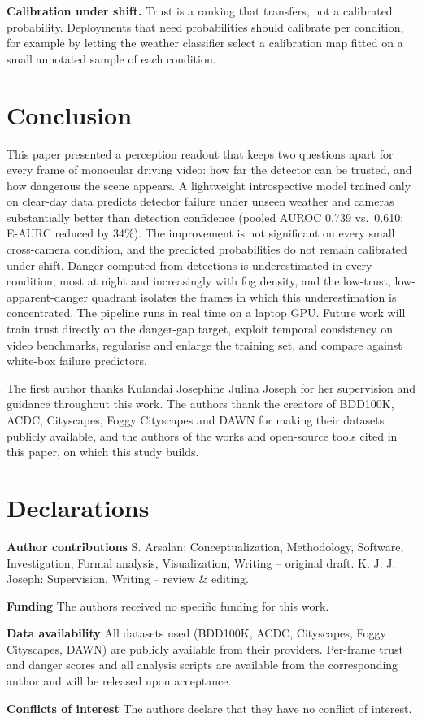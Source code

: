 \documentclass[pdflatex,sn-mathphys-num]{sn-jnl}
\begin{document}
\textbf{Calibration under shift.} Trust is a ranking that transfers, not a calibrated probability. Deployments that need probabilities should calibrate per condition, for example by letting the weather classifier select a calibration map fitted on a small annotated sample of each condition.

\section{Conclusion}\label{sec:conclusion}

This paper presented a perception readout that keeps two questions apart for every frame of monocular driving video: how far the detector can be trusted, and how dangerous the scene appears. A lightweight introspective model trained only on clear-day data predicts detector failure under unseen weather and cameras substantially better than detection confidence (pooled AUROC 0.739 vs.\ 0.610; E-AURC reduced by 34\%). The improvement is not significant on every small cross-camera condition, and the predicted probabilities do not remain calibrated under shift. Danger computed from detections is underestimated in every condition, most at night and increasingly with fog density, and the low-trust, low-apparent-danger quadrant isolates the frames in which this underestimation is concentrated. The pipeline runs in real time on a laptop GPU. Future work will train trust directly on the danger-gap target, exploit temporal consistency on video benchmarks, regularise and enlarge the training set, and compare against white-box failure predictors.

\backmatter

The first author thanks Kulandai Josephine Julina Joseph for her supervision and guidance throughout this work. The authors thank the creators of BDD100K, ACDC, Cityscapes, Foggy Cityscapes and DAWN for making their datasets publicly available, and the authors of the works and open-source tools cited in this paper, on which this study builds.

\section*{Declarations}

\textbf{Author contributions} S. Arsalan: Conceptualization, Methodology, Software, Investigation, Formal analysis, Visualization, Writing -- original draft. K. J. J. Joseph: Supervision, Writing -- review \& editing.

\textbf{Funding} The authors received no specific funding for this work. %

\textbf{Data availability} All datasets used (BDD100K, ACDC, Cityscapes, Foggy Cityscapes, DAWN) are publicly available from their providers. Per-frame trust and danger scores and all analysis scripts are available from the corresponding author and will be released upon acceptance.

\textbf{Conflicts of interest} The authors declare that they have no conflict of interest.


\end{document}
